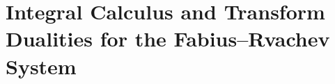 \documentclass[11pt,oneside]{article}
\renewcommand{\headrulewidth}{0.4pt}
\newcommand{\integrationreportreset}{%
  \clearpage
  \setcounter{section}{0}%
  \renewcommand{\thesection}{\arabic{section}}}
\theoremstyle{definition}
\theoremstyle{remark}
\newcommand{\1}{\mathbf 1}
\begin{document}
\newcommand{\numPartc}[1]{\texttt{#1}}
\renewcommand{\headrulewidth}{0.35pt}
\newcommand{\upf}{\operatorname{up}}
\newcommand{\MPartc}{\mathfrak M}
\newcommand{\ind}{\mathbf 1}
\newcommand{\LiPartc}{\operatorname{Li}}
\newcommand{\sgn}{\operatorname{sgn}}
\newcommand{\Var}{\operatorname{Var}}
\newcommand{\Cov}{\operatorname{Cov}}
\newcommand{\Res}{\operatorname{Res}}
\newcommand{\RePart}{\operatorname{Re}}
\newcommand{\ImPart}{\operatorname{Im}}

\integrationreportreset
\part{Integral Calculus and Transform Dualities for the Fabius--Rvachev System}
\end{document}
